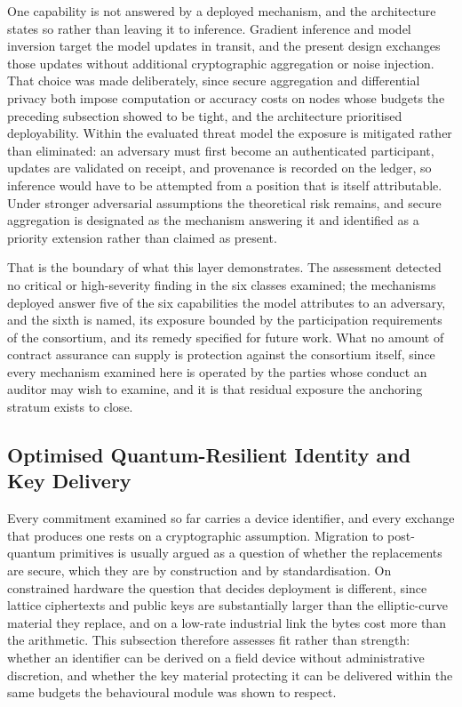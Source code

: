 One capability is not answered by a deployed mechanism, and the architecture states so rather than leaving it to inference. Gradient inference and model inversion target the model updates in transit, and the present design exchanges those updates without additional cryptographic aggregation or noise injection. That choice was made deliberately, since secure aggregation and differential privacy both impose computation or accuracy costs on nodes whose budgets the preceding subsection showed to be tight, and the architecture prioritised deployability. Within the evaluated threat model the exposure is mitigated rather than eliminated: an adversary must first become an authenticated participant, updates are validated on receipt, and provenance is recorded on the ledger, so inference would have to be attempted from a position that is itself attributable. Under stronger adversarial assumptions the theoretical risk remains, and secure aggregation is designated as the mechanism answering it and identified as a priority extension rather than claimed as present.

That is the boundary of what this layer demonstrates. The assessment detected no
critical or high-severity finding in the six classes examined; the mechanisms
deployed answer five of the six capabilities the model attributes to an
adversary, and the sixth is named, its exposure bounded by the participation
requirements of the consortium, and its remedy specified for future work. What
no amount of contract assurance can supply is protection against the consortium
itself, since every mechanism examined here is operated by the parties whose
conduct an auditor may wish to examine, and it is that residual exposure the
anchoring stratum exists to close.

\subsection{Optimised Quantum-Resilient Identity and Key Delivery}
\label{sec:eval-identity}
Every commitment examined so far carries a device identifier, and every exchange that produces one rests on a cryptographic assumption. Migration to post-quantum primitives is usually argued as a question of whether the replacements are secure, which they are by construction and by standardisation. On constrained hardware the question that decides deployment is different, since lattice ciphertexts and public keys are substantially larger than the elliptic-curve material they replace, and on a low-rate industrial link the bytes cost more than the arithmetic. This subsection therefore assesses fit rather than strength: whether an identifier can be derived on a field device without administrative discretion, and whether the key material protecting it can be delivered within the same budgets the behavioural module was shown to respect.

